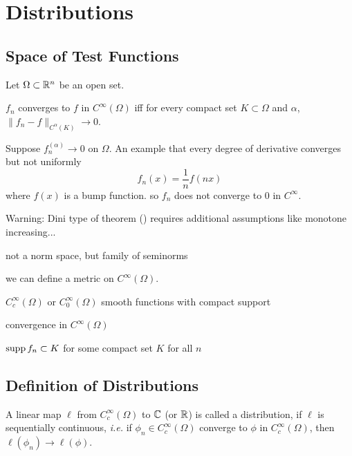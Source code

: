 \chapter{Distributions}


\section{Space of Test Functions}

Let $\Omega\subset\mathbb{R}^n$ be an open set.

\begin{definition}
    $f_n$ converges to $f$ in $C^\infty(\Omega)$ iff for every compact set $K\subset \Omega$ and $\alpha$, $\|f_n-f\|_{C^\alpha(K)}\to 0$.
\end{definition}
\begin{example}
    Suppose $f^{(\alpha)}_n\to 0$ on $\Omega$.
    An example that every degree of derivative converges but not uniformly 
    \[ f_n(x)= \frac{1}{n}f(nx)\]
    where $f(x)$ is a bump function.
    so $f_n$ does not converge to $0$ in $C^\infty$.
\end{example}
\begin{remark}
    Warning: Dini type of theorem () requires additional assumptions like monotone increasing...
\end{remark}


not a norm space, but family of seminorms

we can define a metric on $C^\infty(\Omega)$.

$C_c^\infty(\Omega)$ or $C_0^\infty(\Omega)$ smooth functions with compact support

\begin{definition}
    convergence in $C^\infty(\Omega)$

    $\operatorname{supp} f_n\subset K$ for some compact set $K$ for all $n$
\end{definition}


\section{Definition of Distributions}



\begin{definition}
    A linear map $\ell$ from $C_c^\infty(\Omega)$ to $\mathbb{C}$ (or $\mathbb{R}$) is called a distribution, if $\ell$ is sequentially continuous, \emph{i.e.}
if $\phi_n\in C_c^\infty(\Omega)$ converge to $\phi$ in $C_c^\infty(\Omega)$, then $\ell(\phi_n)\to\ell(\phi)$.
\end{definition}

